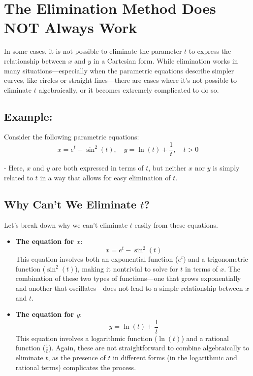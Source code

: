 \documentclass{article}
\begin{document}
\section*{The Elimination Method Does NOT Always Work}
\begin{warningbox}
    In some cases, it is not possible to eliminate the parameter \( t \) to express the relationship between \( x \) and \( y \) in a Cartesian form. While elimination works in many situations—especially when the parametric equations describe simpler curves, like circles or straight lines—there are cases where it's not possible to eliminate \( t \) algebraically, or it becomes extremely complicated to do so. 
    
    \subsection*{Example:}
    
    Consider the following parametric equations:
    \[
    x = e^t - \sin^2(t), \quad y = \ln(t) + \frac{1}{t}, \quad t > 0
    \]
    
    - Here, \( x \) and \( y \) are both expressed in terms of \( t \), but neither \( x \) nor \( y \) is simply related to \( t \) in a way that allows for easy elimination of \( t \).
    
    \subsection*{Why Can't We Eliminate \( t \)?}
    
    Let's break down why we can't eliminate \( t \) easily from these equations.
    
    \begin{itemize}
        \item \textbf{The equation for \( x \)}:
        \[
        x = e^t - \sin^2(t)
        \]
        This equation involves both an exponential function (\( e^t \)) and a trigonometric function (\( \sin^2(t) \)), making it nontrivial to solve for \( t \) in terms of \( x \). The combination of these two types of functions—one that grows exponentially and another that oscillates—does not lead to a simple relationship between \( x \) and \( t \).
        
        \item \textbf{The equation for \( y \)}:
        \[
        y = \ln(t) + \frac{1}{t}
        \]
        This equation involves a logarithmic function (\( \ln(t) \)) and a rational function (\( \frac{1}{t} \)). Again, these are not straightforward to combine algebraically to eliminate \( t \), as the presence of \( t \) in different forms (in the logarithmic and rational terms) complicates the process.
    \end{itemize}
    

\end{warningbox}
\end{document}
